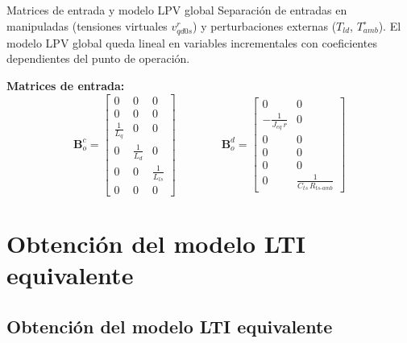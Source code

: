 \documentclass[aspectratio=169,t]{beamer}
\newcommand{\SecPresentacion}{Presentación del problema}
\newcommand{\SecMecanico}{Subsistema mecánico equivalente}
\newcommand{\SecElectromagnetico}{Subsistema electromagnético en coordenadas qd0}
\newcommand{\SecTermico}{Subsistema térmico}
\newcommand{\SecNLGlobal}{Sistema No Lineal Global}
\newcommand{\SecLPV}{Linealización Jacobiana (LPV)}
\newcommand{\SecLTI}{Obtención del modelo LTI equivalente}
\newcommand{\SecAnalisisLTI}{Análisis del modelo LTI aumentado}
\newcommand{\SecDinamica}{Respuesta dinámica en dominio del tiempo}
\newcommand{\SecControlador}{Diseño y análisis del controlador en cascada}
\newcommand{\SecVerifSpecs}{Verificación de desempeño: Especificaciones de operación}
\newcommand{\SecVerifOffset}{Verificación de desempeño: Offset de estado estacionario}
\newcommand{\SecVerifNoIdealidades}{Verificación de desempeño: No idealidades y comportamiento térmico}
\newcommand{\SecDiscretizacion}{Discretización del controlador}
\newcommand{\SecSoftware}{Codificación del software de control}
\newcommand{\AgendaItem}[3]{%
  \ifnum#1=#2
    {\scriptsize\bfseries\color{uncBlue}%
      \hyperlink{sec:#1}{\makebox[2.2em][r]{#1.}\hspace{0.7em}%
      \parbox[t]{0.86\textwidth}{#3}}\par}%
  \else
    {\scriptsize\color{black!26}%
      \hyperlink{sec:#1}{\makebox[2.2em][r]{#1.}\hspace{0.7em}%
      \parbox[t]{0.86\textwidth}{#3}}\par}%
  \fi
  \vspace{0.35mm}%
}
\newcommand{\AgendaBody}[1]{%
    \vspace{3mm}
    {\Large\bfseries\color{uncBlue}Tabla de contenidos\par}
    \vspace{2mm}
    \begin{minipage}{0.94\textwidth}
      \AgendaItem{1}{#1}{\SecPresentacion}
      \AgendaItem{2}{#1}{\SecMecanico}
      \AgendaItem{3}{#1}{\SecElectromagnetico}
      \AgendaItem{4}{#1}{\SecTermico}
      \AgendaItem{5}{#1}\SecNLGlobal
      \AgendaItem{6}{#1}{\SecLPV}
      \AgendaItem{7}{#1}{\SecLTI}
      \AgendaItem{8}{#1}{\SecAnalisisLTI}
      \AgendaItem{9}{#1}{\SecDinamica}
      \AgendaItem{10}{#1}{\SecControlador}
      \AgendaItem{11}{#1}{\SecVerifSpecs}
      \AgendaItem{12}{#1}{\SecVerifOffset}
      \AgendaItem{13}{#1}{\SecVerifNoIdealidades}
      \AgendaItem{14}{#1}{\SecDiscretizacion}
      \AgendaItem{15}{#1}{\SecSoftware}
    \end{minipage}
    \vfill
}
\newcommand{\AgendaSlideTarget}[2]{%
  \begin{frame}[plain]
    \hypertarget{#2}{}%
    \AgendaBody{#1}
  \end{frame}
}
\newcommand{\StartProjectSection}[2]{%
  \section{#2}%
  \subsection{#2}%
  \AgendaSlideTarget{#1}{sec:#1}%
}
\begin{document}
\begin{frame}{Matrices de entrada y modelo LPV global}
{\small\color{uncGray}Separación de entradas en manipuladas (tensiones virtuales $v_{qd0s}^{r}$) y perturbaciones externas ($T_{ld}$, $T_{amb}^\circ$). El modelo LPV global queda lineal en variables incrementales con coeficientes dependientes del punto de operación.}\par
\vspace{3mm}

\textbf{Matrices de entrada:}
\[
\bm{B}_o^c = \begin{bmatrix}
0 & 0 & 0 \\ 0 & 0 & 0 \\ \tfrac{1}{L_q} & 0 & 0 \\ 0 & \tfrac{1}{L_d} & 0 \\ 0 & 0 & \tfrac{1}{L_{ls}} \\ 0 & 0 & 0
\end{bmatrix}
\qquad\qquad
\bm{B}_o^d = \begin{bmatrix}
0 & 0 \\ -\tfrac{1}{J_{eq}\,r} & 0 \\ 0 & 0 \\ 0 & 0 \\ 0 & 0 \\ 0 & \tfrac{1}{C_{ts}\,R_{ts\text{-}amb}}
\end{bmatrix}
\]

\vspace{3mm}

\end{frame}

\StartProjectSection{7}{\SecLTI}
\end{document}
